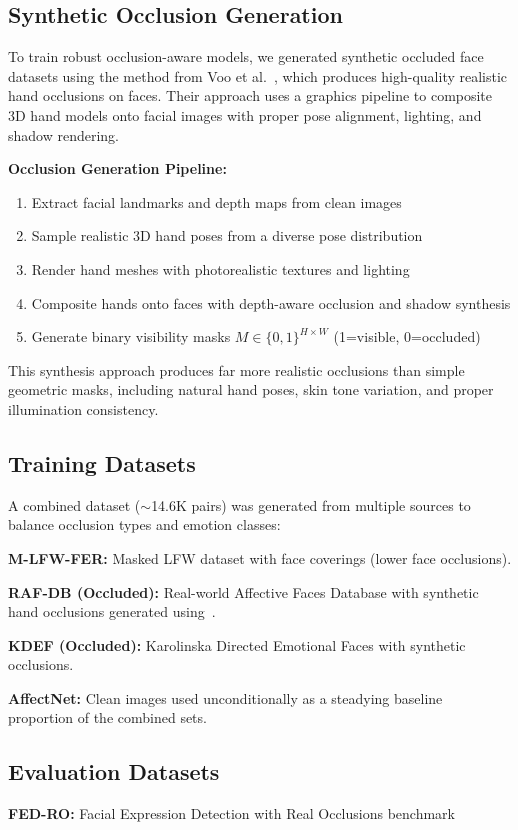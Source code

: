 \documentclass[10pt,twocolumn]{article}
\begin{document}
\subsection{Synthetic Occlusion Generation}
To train robust occlusion-aware models, we generated synthetic occluded face datasets using the method from Voo et al.~\cite{voo2022delving}, which produces high-quality realistic hand occlusions on faces. Their approach uses a graphics pipeline to composite 3D hand models onto facial images with proper pose alignment, lighting, and shadow rendering.

\textbf{Occlusion Generation Pipeline:}
\begin{enumerate}
    \item Extract facial landmarks and depth maps from clean images
    \item Sample realistic 3D hand poses from a diverse pose distribution
    \item Render hand meshes with photorealistic textures and lighting
    \item Composite hands onto faces with depth-aware occlusion and shadow synthesis
    \item Generate binary visibility masks $M \in \{0,1\}^{H \times W}$ (1=visible, 0=occluded)
\end{enumerate}

This synthesis approach produces far more realistic occlusions than simple geometric masks, including natural hand poses, skin tone variation, and proper illumination consistency.

\subsection{Training Datasets}
A combined dataset ($\sim$14.6K pairs) was generated from multiple sources to balance occlusion types and emotion classes:

\textbf{M-LFW-FER:} Masked LFW dataset with face coverings (lower face occlusions).

\textbf{RAF-DB (Occluded):} Real-world Affective Faces Database with synthetic hand occlusions generated using~\cite{voo2022delving}.

\textbf{KDEF (Occluded):} Karolinska Directed Emotional Faces with synthetic occlusions.

\textbf{AffectNet:} Clean images used unconditionally as a steadying baseline proportion of the combined sets.

\subsection{Evaluation Datasets}
\textbf{FED-RO:} Facial Expression Detection with Real Occlusions benchmark
\end{document}
